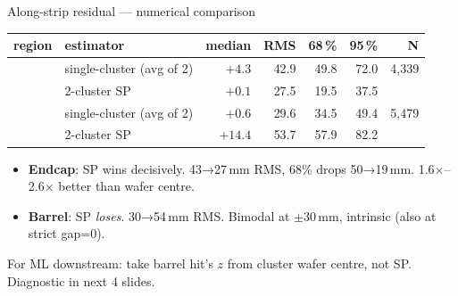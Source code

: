 \documentclass[aspectratio=169,10pt]{beamer}
\begin{document}
\begin{frame}{Along-strip residual --- numerical comparison}
\begin{table}
\centering
\small
\begin{tabular}{llrrrrr}
\toprule
region & estimator & median & RMS & 68\,\% & 95\,\% & N \\
\midrule
{}
        & single-cluster (avg of 2) & $+4.3$  & 42.9 & 49.8 & 72.0 & 4{,}339 \\
        & 2-cluster SP              & $+0.1$  & \alert{27.5} & \alert{19.5} & 37.5 &       \\[1ex]
        & single-cluster (avg of 2) & $+0.6$  & 29.6 & 34.5 & 49.4 & 5{,}479 \\
        & 2-cluster SP              & $+14.4$ & \alert{53.7} & \alert{57.9} & 82.2 &       \\
\bottomrule
\end{tabular}
\end{table}

\vspace{-0.5ex}
\footnotesize
\begin{itemize}\itemsep0pt
  \item \textbf{Endcap}: SP wins decisively. 43→27\,mm RMS, 68\% drops 50→19\,mm. 1.6$\times$--2.6$\times$ better than wafer centre.
  \item \textbf{Barrel}: SP \emph{loses}. 30→54\,mm RMS. Bimodal at $\pm$30\,mm, intrinsic (also at strict gap=0).
\end{itemize}

\alert{For ML downstream: take barrel hit's $z$ from cluster wafer centre, not SP.} Diagnostic in next 4 slides.
\end{frame}
\end{document}
